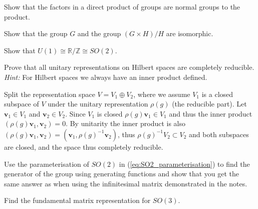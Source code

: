 \documentclass[notes.tex]{subfiles}
\begin{document}
\begin{Exercise}[]
Show that the factors in a direct product of groups are normal groups to the product.
\end{Exercise}

\begin{Exercise}[]
Show that the group $G$ and the group $(G\times H) / H$ are isomorphic.
\end{Exercise}


\begin{Exercise}[]
Show that $U(1)\cong\mathbb{R}/\mathbb{Z}\cong SO(2)$.
\end{Exercise}


\begin{Exercise}[difficulty={2}]
Prove that all unitary representations on Hilbert spaces are completely reducible. {\it Hint:} For Hilbert spaces we always have an inner product defined.
\end{Exercise}
\begin{Answer}
Split the representation space $V=V_1\oplus V_2$, where we assume $V_1$ is a closed subspace of $V$ under the unitary representation $\rho(g)$ (the reducible part). Let $\mathbf v_1\in V_1$ and $\mathbf v_2\in V_2$.  Since $V_1$ is closed $\rho(g)\mathbf v_1 \in V_1$ and thus the inner product $(\rho(g)\mathbf v_1,  \mathbf v_2)=0$.  By unitarity the inner product is also $(\rho(g)\mathbf v_1,  \mathbf v_2)=(\mathbf v_1, \rho(g)^{-1}\mathbf v_2)$, thus $\rho(g)^{-1}V_2 \subset V_2$ and both subspaces are closed, and the space thus completely reducible. 
\end{Answer}


\begin{Exercise}[difficulty={1}]
Use the parameterisation of $SO(2)$ in (\ref{eq:SO2_parameterisation}) to find the generator of the group using generating functions and show that you get the same answer as when using the infinitesimal matrix demonstrated in the notes.
\end{Exercise}


\begin{Exercise}[]
Find the fundamental matrix representation for $SO(3)$.
\end{Exercise}
\end{document}
